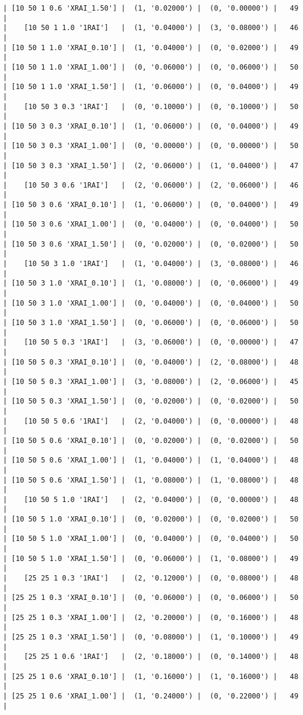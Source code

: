 \documentclass{article}
\begin{document}
\begin{verbatim}
| [10 50 1 0.6 'XRAI_1.50'] |  (1, '0.02000') |  (0, '0.00000') |   49  |
|    [10 50 1 1.0 '1RAI']   |  (1, '0.04000') |  (3, '0.08000') |   46  |
| [10 50 1 1.0 'XRAI_0.10'] |  (1, '0.04000') |  (0, '0.02000') |   49  |
| [10 50 1 1.0 'XRAI_1.00'] |  (0, '0.06000') |  (0, '0.06000') |   50  |
| [10 50 1 1.0 'XRAI_1.50'] |  (1, '0.06000') |  (0, '0.04000') |   49  |
|    [10 50 3 0.3 '1RAI']   |  (0, '0.10000') |  (0, '0.10000') |   50  |
| [10 50 3 0.3 'XRAI_0.10'] |  (1, '0.06000') |  (0, '0.04000') |   49  |
| [10 50 3 0.3 'XRAI_1.00'] |  (0, '0.00000') |  (0, '0.00000') |   50  |
| [10 50 3 0.3 'XRAI_1.50'] |  (2, '0.06000') |  (1, '0.04000') |   47  |
|    [10 50 3 0.6 '1RAI']   |  (2, '0.06000') |  (2, '0.06000') |   46  |
| [10 50 3 0.6 'XRAI_0.10'] |  (1, '0.06000') |  (0, '0.04000') |   49  |
| [10 50 3 0.6 'XRAI_1.00'] |  (0, '0.04000') |  (0, '0.04000') |   50  |
| [10 50 3 0.6 'XRAI_1.50'] |  (0, '0.02000') |  (0, '0.02000') |   50  |
|    [10 50 3 1.0 '1RAI']   |  (1, '0.04000') |  (3, '0.08000') |   46  |
| [10 50 3 1.0 'XRAI_0.10'] |  (1, '0.08000') |  (0, '0.06000') |   49  |
| [10 50 3 1.0 'XRAI_1.00'] |  (0, '0.04000') |  (0, '0.04000') |   50  |
| [10 50 3 1.0 'XRAI_1.50'] |  (0, '0.06000') |  (0, '0.06000') |   50  |
|    [10 50 5 0.3 '1RAI']   |  (3, '0.06000') |  (0, '0.00000') |   47  |
| [10 50 5 0.3 'XRAI_0.10'] |  (0, '0.04000') |  (2, '0.08000') |   48  |
| [10 50 5 0.3 'XRAI_1.00'] |  (3, '0.08000') |  (2, '0.06000') |   45  |
| [10 50 5 0.3 'XRAI_1.50'] |  (0, '0.02000') |  (0, '0.02000') |   50  |
|    [10 50 5 0.6 '1RAI']   |  (2, '0.04000') |  (0, '0.00000') |   48  |
| [10 50 5 0.6 'XRAI_0.10'] |  (0, '0.02000') |  (0, '0.02000') |   50  |
| [10 50 5 0.6 'XRAI_1.00'] |  (1, '0.04000') |  (1, '0.04000') |   48  |
| [10 50 5 0.6 'XRAI_1.50'] |  (1, '0.08000') |  (1, '0.08000') |   48  |
|    [10 50 5 1.0 '1RAI']   |  (2, '0.04000') |  (0, '0.00000') |   48  |
| [10 50 5 1.0 'XRAI_0.10'] |  (0, '0.02000') |  (0, '0.02000') |   50  |
| [10 50 5 1.0 'XRAI_1.00'] |  (0, '0.04000') |  (0, '0.04000') |   50  |
| [10 50 5 1.0 'XRAI_1.50'] |  (0, '0.06000') |  (1, '0.08000') |   49  |
|    [25 25 1 0.3 '1RAI']   |  (2, '0.12000') |  (0, '0.08000') |   48  |
| [25 25 1 0.3 'XRAI_0.10'] |  (0, '0.06000') |  (0, '0.06000') |   50  |
| [25 25 1 0.3 'XRAI_1.00'] |  (2, '0.20000') |  (0, '0.16000') |   48  |
| [25 25 1 0.3 'XRAI_1.50'] |  (0, '0.08000') |  (1, '0.10000') |   49  |
|    [25 25 1 0.6 '1RAI']   |  (2, '0.18000') |  (0, '0.14000') |   48  |
| [25 25 1 0.6 'XRAI_0.10'] |  (1, '0.16000') |  (1, '0.16000') |   48  |
| [25 25 1 0.6 'XRAI_1.00'] |  (1, '0.24000') |  (0, '0.22000') |   49  |

\end{verbatim}
\end{document}
